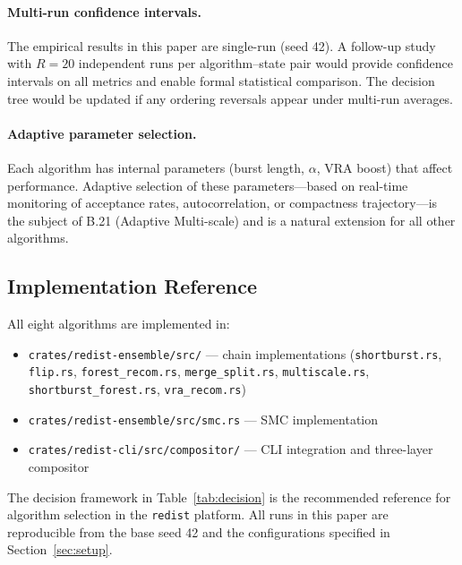 \paragraph{Multi-run confidence intervals.}
The empirical results in this paper are single-run (seed 42).
A follow-up study with $R = 20$ independent runs per algorithm--state pair
would provide confidence intervals on all metrics and enable formal
statistical comparison.
The decision tree would be updated if any ordering reversals appear under
multi-run averages.

\paragraph{Adaptive parameter selection.}
Each algorithm has internal parameters (burst length, $\alpha$, VRA boost)
that affect performance.
Adaptive selection of these parameters---based on real-time monitoring of
acceptance rates, autocorrelation, or compactness trajectory---is the
subject of B.21 (Adaptive Multi-scale) and is a natural extension for
all other algorithms.

\subsection{Implementation Reference}

All eight algorithms are implemented in:
\begin{itemize}
  \item \texttt{crates/redist-ensemble/src/} --- chain implementations
        (\texttt{shortburst.rs}, \texttt{flip.rs}, \texttt{forest\_recom.rs},
        \texttt{merge\_split.rs}, \texttt{multiscale.rs},
        \texttt{shortburst\_forest.rs}, \texttt{vra\_recom.rs})
  \item \texttt{crates/redist-ensemble/src/smc.rs} --- SMC implementation
  \item \texttt{crates/redist-cli/src/compositor/} --- CLI integration and
        three-layer compositor
\end{itemize}

The decision framework in Table~\ref{tab:decision} is the recommended
reference for algorithm selection in the \texttt{redist} platform.
All runs in this paper are reproducible from the base seed 42 and the
configurations specified in Section~\ref{sec:setup}.
